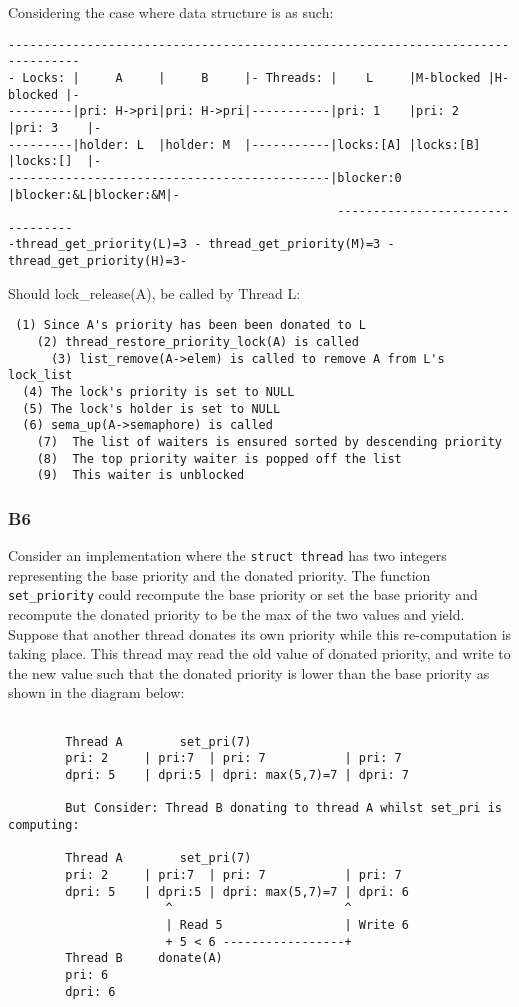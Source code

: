 \documentclass[a4wide, 11pt]{article}
\newcommand{\tx}{\texttt}
\begin{document}
Considering the case where data structure is as such:

\begin{verbatim}
--------------------------------------------------------------------------------
- Locks: |     A     |     B     |- Threads: |    L     |M-blocked |H-blocked |-
---------|pri: H->pri|pri: H->pri|-----------|pri: 1    |pri: 2    |pri: 3    |-
---------|holder: L  |holder: M  |-----------|locks:[A] |locks:[B] |locks:[]  |-
---------------------------------------------|blocker:0 |blocker:&L|blocker:&M|-
                                              ---------------------------------
-thread_get_priority(L)=3 - thread_get_priority(M)=3 - thread_get_priority(H)=3-
\end{verbatim}

Should lock\_release(A), be called by Thread L:
\begin{verbatim}
 (1) Since A's priority has been been donated to L
    (2) thread_restore_priority_lock(A) is called
      (3) list_remove(A->elem) is called to remove A from L's lock_list
  (4) The lock's priority is set to NULL
  (5) The lock's holder is set to NULL
  (6) sema_up(A->semaphore) is called
    (7)  The list of waiters is ensured sorted by descending priority
    (8)  The top priority waiter is popped off the list
    (9)  This waiter is unblocked
\end{verbatim}

\subsubsection{B6}
Consider an implementation where the \tx{struct thread} has two integers representing the base priority and the donated priority. The function \tx{set\_priority} could recompute the base priority or set the base priority and recompute the donated priority to be the max of the two values and yield. Suppose that another thread donates its own priority while this re-computation is taking place. This thread may read the old value of donated priority, and write to the new value such that the donated priority is lower than the base priority as shown in the diagram below:
\begin{verbatim}

        Thread A        set_pri(7)
        pri: 2     | pri:7  | pri: 7           | pri: 7
        dpri: 5    | dpri:5 | dpri: max(5,7)=7 | dpri: 7

        But Consider: Thread B donating to thread A whilst set_pri is computing: 

        Thread A        set_pri(7)
        pri: 2     | pri:7  | pri: 7           | pri: 7
        dpri: 5    | dpri:5 | dpri: max(5,7)=7 | dpri: 6
                      ^                        ^
                      | Read 5                 | Write 6
                      + 5 < 6 -----------------+
        Thread B     donate(A)
        pri: 6
        dpri: 6 
\end{verbatim}    
\end{document}
